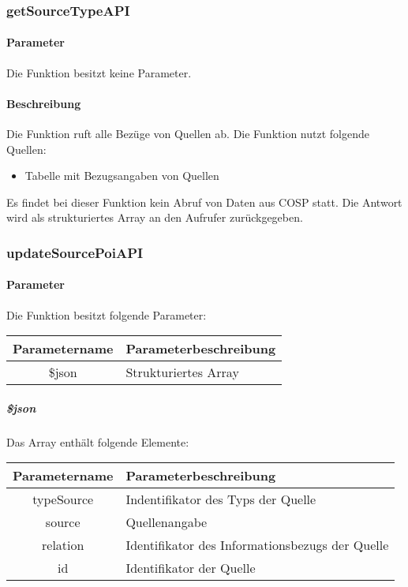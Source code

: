 \subsubsection{getSourceTypeAPI}
\paragraph{Parameter} Die Funktion besitzt keine Parameter.
\paragraph{Beschreibung} Die Funktion ruft alle Bezüge von Quellen ab. Die Funktion nutzt folgende Quellen:
\begin{itemize}
	\item Tabelle mit Bezugsangaben von Quellen
\end{itemize}
Es findet bei dieser Funktion kein Abruf von Daten aus {\glqq COSP\grqq} statt. Die Antwort wird als strukturiertes Array an den Aufrufer zurückgegeben.
\subsubsection{updateSourcePoiAPI}
\paragraph{Parameter} Die Funktion besitzt folgende Parameter:
\begin{table}[H]
	\begin{tabular}{|c|p{11cm}|}
		\hline
		\textbf{Parametername} & \textbf{Parameterbeschreibung} \\ \hline
		\$json & Strukturiertes Array \\ \hline
	\end{tabular}
\end{table}
\subparagraph{\$json}Das Array enthält folgende Elemente:
\begin{table}[H]
	\begin{tabular}{|c|p{11cm}|}
		\hline
		\textbf{Parametername} & \textbf{Parameterbeschreibung} \\ \hline
		typeSource & Indentifikator des Typs der Quelle \\ \hline
		source     & Quellenangabe \\ \hline
		relation   & Identifikator des Informationsbezugs der Quelle \\ \hline
		id         & Identifikator der Quelle \\ \hline
	\end{tabular}
\end{table}
